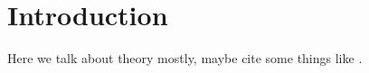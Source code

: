 
\section{Introduction}

Here we talk about theory mostly, maybe cite some things like \cite{lamport1994latex}.

